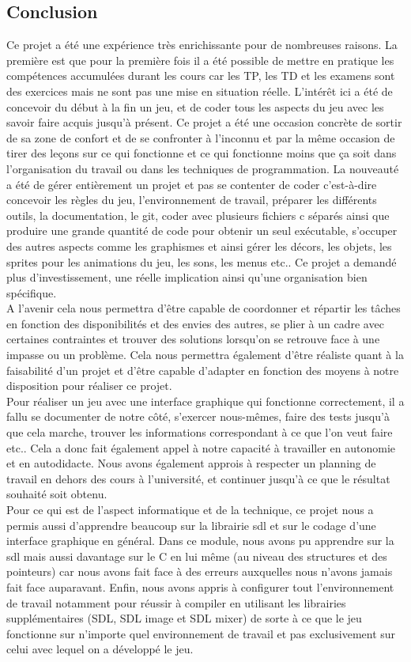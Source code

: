 \documentclass[a4paper,11pt]{article}
\begin{document}
\subsection{Conclusion}
Ce projet a été une expérience très enrichissante pour de nombreuses raisons. La première est que pour la première fois il a été 
possible de mettre en pratique les compétences accumulées durant les cours car les TP, les TD et les examens sont des exercices
mais ne sont pas une mise en situation réelle. L'intérêt ici a été de concevoir du début à la fin un jeu, et de coder tous les aspects
du jeu avec les savoir faire acquis jusqu'à présent. Ce projet a été une occasion concrète de sortir de sa zone de confort et de se confronter
à l'inconnu et par la même occasion de tirer des leçons sur ce qui fonctionne et ce qui fonctionne moins que ça soit dans l'organisation
du travail ou dans les techniques de programmation. La nouveauté a été de gérer entièrement un projet et pas se contenter de coder c'est-à-dire
concevoir les règles du jeu, l'environnement de travail, préparer les différents outils, la documentation, le git, coder avec plusieurs 
fichiers c séparés ainsi que produire une grande quantité de code pour obtenir un seul exécutable, s'occuper des autres aspects comme les graphismes
et ainsi gérer les décors, les objets, les sprites pour les animations du jeu, les sons, les menus etc.. Ce projet a demandé plus d'investissement, une réelle implication
ainsi qu'une organisation bien spécifique.\\
A l'avenir cela nous permettra d'être capable de coordonner et répartir les tâches en fonction des disponibilités et des envies des autres,
se plier à un cadre avec certaines contraintes et trouver des solutions lorsqu'on se retrouve face à une impasse ou un problème. Cela nous
permettra également d'être réaliste quant à la faisabilité d'un projet et d'être capable d'adapter en fonction des moyens à notre disposition
pour réaliser ce projet.\\
Pour réaliser un jeu avec une interface graphique qui fonctionne correctement, il a fallu se documenter 
de notre côté, s'exercer nous-mêmes, faire des tests jusqu'à que cela marche, trouver les informations correspondant à ce que l'on veut faire etc..
Cela a donc fait également appel à notre capacité à travailler en autonomie et en autodidacte. Nous avons également approis à respecter un planning de travail en dehors des cours
à l'université, et continuer jusqu'à ce que le résultat souhaité soit obtenu.\\
Pour ce qui est de l'aspect informatique et de la technique, ce projet nous a permis aussi d'apprendre beaucoup sur la librairie sdl et sur le
codage d'une interface graphique en général.
Dans ce module, nous avons pu apprendre sur la sdl mais aussi davantage sur le C en lui même (au niveau des structures et des pointeurs)
car nous avons fait face à des erreurs auxquelles nous n'avons jamais fait face auparavant. 
Enfin, nous avons appris à configurer tout l'environnement de travail notamment pour réussir à compiler en utilisant les librairies supplémentaires
(SDL, SDL image et SDL mixer) de sorte à ce que le jeu fonctionne sur n'importe quel environnement de travail et pas exclusivement sur celui avec lequel
on a développé le jeu.\\
\newpage
\end{document}
